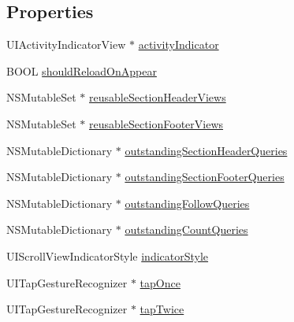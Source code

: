 \subsection*{Properties}
\begin{DoxyCompactItemize}
\item 
U\+I\+Activity\+Indicator\+View $\ast$ \hyperlink{interface_e_s_photo_timeline_account_view_controller_a490a07a36b14c7a4ed82769969b0e872}{activity\+Indicator}
\item 
B\+O\+O\+L \hyperlink{interface_e_s_photo_timeline_account_view_controller_a976b660303e7268207f0aa28effb3cce}{should\+Reload\+On\+Appear}
\item 
N\+S\+Mutable\+Set $\ast$ \hyperlink{interface_e_s_photo_timeline_account_view_controller_a19f0709ebf4bc4cfd02b6e984f4fbc06}{reusable\+Section\+Header\+Views}
\item 
N\+S\+Mutable\+Set $\ast$ \hyperlink{interface_e_s_photo_timeline_account_view_controller_ac5cd49f1c6469937aada741e00237d30}{reusable\+Section\+Footer\+Views}
\item 
N\+S\+Mutable\+Dictionary $\ast$ \hyperlink{interface_e_s_photo_timeline_account_view_controller_ace9b8c3ba956c301ba8dc6079ca01f31}{outstanding\+Section\+Header\+Queries}
\item 
N\+S\+Mutable\+Dictionary $\ast$ \hyperlink{interface_e_s_photo_timeline_account_view_controller_a95b3f891f2ff0e8fe5015e40b18122e5}{outstanding\+Section\+Footer\+Queries}
\item 
N\+S\+Mutable\+Dictionary $\ast$ \hyperlink{interface_e_s_photo_timeline_account_view_controller_ab5962346b5ae048912b29e064d67ab28}{outstanding\+Follow\+Queries}
\item 
N\+S\+Mutable\+Dictionary $\ast$ \hyperlink{interface_e_s_photo_timeline_account_view_controller_af68a16a2af5206d98b465517a408eb76}{outstanding\+Count\+Queries}
\item 
U\+I\+Scroll\+View\+Indicator\+Style \hyperlink{interface_e_s_photo_timeline_account_view_controller_a06ee424aadd9b70c2451b67242372323}{indicator\+Style}
\item 
U\+I\+Tap\+Gesture\+Recognizer $\ast$ \hyperlink{interface_e_s_photo_timeline_account_view_controller_a7d7d30619f0d39e4c8750fdd768017c2}{tap\+Once}
\item 
U\+I\+Tap\+Gesture\+Recognizer $\ast$ \hyperlink{interface_e_s_photo_timeline_account_view_controller_af9b1728e7ee6a6bff93bc5359aa65ca1}{tap\+Twice}
\end{DoxyCompactItemize}


